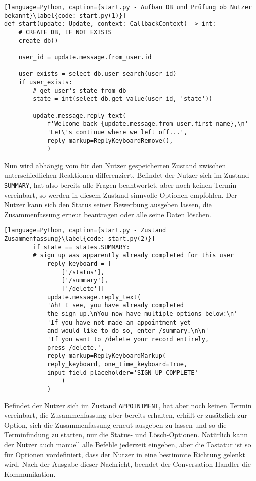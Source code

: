            \begin{lstlisting}[language=Python, caption={start.py - Aufbau DB und Prüfung ob Nutzer bekannt}\label{code: start.py(1)}]
def start(update: Update, context: CallbackContext) -> int:
    # CREATE DB, IF NOT EXISTS
    create_db()

    user_id = update.message.from_user.id

    user_exists = select_db.user_search(user_id)
    if user_exists:
        # get user's state from db
        state = int(select_db.get_value(user_id, 'state'))

        update.message.reply_text(
            f'Welcome back {update.message.from_user.first_name},\n'
            'Let\'s continue where we left off...',
            reply_markup=ReplyKeyboardRemove(),
            )
            \end{lstlisting}
            Nun wird abhängig vom für den Nutzer gespeicherten Zustand zwischen unterschiedlichen Reaktionen differenziert. Befindet der Nutzer sich im Zustand \verb|SUMMARY|, hat also bereits alle Fragen beantwortet, aber noch keinen Termin vereinbart, so werden in diesem Zustand sinnvolle Optionen empfohlen. Der Nutzer kann sich den Status seiner Bewerbung ausgeben lassen, die Zusammenfassung erneut beantragen oder alle seine Daten löschen.
            \begin{lstlisting}[language=Python, caption={start.py - Zustand Zusammenfassung}\label{code: start.py(2)}]
        if state == states.SUMMARY:  
        # sign up was apparently already completed for this user
            reply_keyboard = [
                ['/status'], 
                ['/summary'],
                ['/delete']]
            update.message.reply_text(
            'Ah! I see, you have already completed 
            the sign up.\nYou now have multiple options below:\n'
            'If you have not made an appointment yet 
            and would like to do so, enter /summary.\n\n'
            'If you want to /delete your record entirely, 
            press /delete.',
            reply_markup=ReplyKeyboardMarkup(
            reply_keyboard, one_time_keyboard=True, 
            input_field_placeholder='SIGN UP COMPLETE'
                )
            )
            \end{lstlisting}
            Befindet der Nutzer sich im Zustand \verb|APPOINTMENT|, hat aber noch keinen Termin vereinbart, die Zusammenfassung aber bereits erhalten, erhält er zusätzlich zur Option, sich die Zusammenfassung erneut ausgeben zu lassen und so die Terminfindung zu starten, nur die Status- und Lösch-Optionen. Natürlich kann der Nutzer auch manuell alle Befehle jederzeit eingeben, aber die Tastatur ist so für Optionen vordefiniert, dass der Nutzer in eine bestimmte Richtung gelenkt wird. Nach der Ausgabe dieser Nachricht, beendet der Conversation-Handler die Kommunikation.
